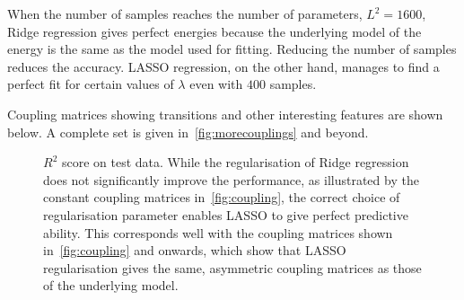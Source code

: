 \documentclass[11pt,british,a4paper]{article}
\numberwithin{equation}{section}
\begin{document}
When the number of samples reaches the number of parameters, \(L^2=\num{1600}\), Ridge regression gives perfect energies because the underlying model of the energy is the same as the model used for fitting. Reducing the number of samples reduces the accuracy. LASSO regression, on the other hand, manages to find a perfect fit for certain values of \(\lambda\) even with \(\num{400}\) samples.

Coupling matrices showing transitions and other interesting features are shown below. A complete set is given in~\vref{fig:morecouplings} and beyond.

\begin{figure}[H]
    \centering
    \caption{\(R^2\) score on test data. While the regularisation of Ridge regression does not significantly improve the performance, as illustrated by the constant coupling matrices in~\vref{fig:coupling}, the correct choice of regularisation parameter enables LASSO to give perfect predictive ability. This corresponds well with the coupling matrices shown in~\ref{fig:coupling} and onwards, which show that LASSO regularisation gives the same, asymmetric coupling matrices as those of the underlying model.}\label{fig:r2}
\end{figure}
\end{document}
